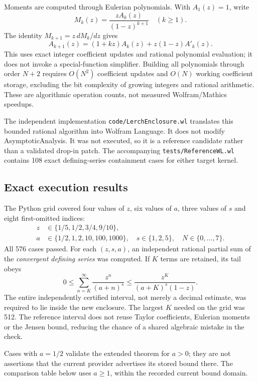\documentclass[11pt,a4paper]{article}
\newcommand{\code}[1]{\nolinkurl{#1}}
\begin{document}
Moments are computed through Eulerian polynomials. With $A_1(z)=1$, write
\[
 M_k(z)=\frac{zA_k(z)}{(1-z)^{k+1}}\quad(k\geq1).
\]
The identity $M_{k+1}=z\,dM_k/dz$ gives
\begin{equation}\label{eq:eulerian-recurrence}
 A_{k+1}(z)=(1+kz)A_k(z)+z(1-z)A'_k(z).
\end{equation}
This uses exact integer coefficient updates and rational polynomial evaluation; it does not invoke a special-function simplifier. Building all polynomials through order $N+2$ requires $O(N^2)$ coefficient updates and $O(N)$ working coefficient storage, excluding the bit complexity of growing integers and rational arithmetic. These are algorithmic operation counts, not measured Wolfram/Mathics speedups.

The independent implementation \code{code/LerchEnclosure.wl} translates this bounded rational algorithm into Wolfram Language. It does not modify AsymptoticAnalysis. It was not executed, so it is a reference candidate rather than a validated drop-in patch. The accompanying \code{tests/ReferenceWL.wl} contains 108 exact defining-series containment cases for either target kernel.

\subsection{Exact execution results}
The Python grid covered four values of $z$, six values of $a$, three values of $s$ and eight first-omitted indices:
\[
\begin{split}
 z&\in\{1/5,1/2,3/4,9/10\},\\
 a&\in\{1/2,1,2,10,100,1000\},\quad
 s\in\{1,2,5\},\quad N\in\{0,\ldots,7\}.
\end{split}
\]
All 576 cases passed. For each $(z,s,a)$, an independent rational partial sum of the \emph{convergent defining series} was computed. If $K$ terms are retained, its tail obeys
\begin{equation}\label{eq:independent-tail}
 0\leq\sum_{n=K}^{\infty}\frac{z^n}{(a+n)^s}
 \leq\frac{z^K}{(a+K)^s(1-z)}.
\end{equation}
The entire independently certified interval, not merely a decimal estimate, was required to lie inside the new enclosure. The largest $K$ needed on the grid was 512. The reference interval does not reuse Taylor coefficients, Eulerian moments or the Jensen bound, reducing the chance of a shared algebraic mistake in the check.

Cases with $a=1/2$ validate the extended theorem for $a>0$; they are not assertions that the current provider advertises its stored bound there. The comparison table below uses $a\geq1$, within the recorded current bound domain.
\end{document}
